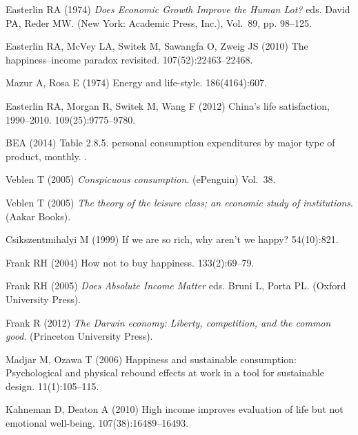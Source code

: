 \documentclass[10pt, letterpaper]{article}
\begin{document}
\begin{spacing}{1.4}
\begin{thebibliography}{10}
Easterlin RA (1974) {\em Does Economic Growth Improve the Human Lot?} eds.{}
  David PA, Reder MW.
\newblock (New York: Academic Press, Inc.), Vol.{}~89, pp. 98--125.

Easterlin RA, McVey LA, Switek M, Sawangfa O, Zweig JS (2010) The
  happiness--income paradox revisited.
  107(52):22463--22468.

Mazur A, Rosa E (1974) Energy and life-style.
 186(4164):607.

Easterlin RA, Morgan R, Switek M, Wang F (2012) China's life satisfaction,
  1990--2010.
  109(25):9775--9780.

BEA (2014) Table 2.8.5. personal consumption expenditures by major type of
  product, monthly.
.

Veblen T (2005) {\em Conspicuous consumption}.
\newblock (ePenguin) Vol.{}~38.

Veblen T (2005) {\em The theory of the leisure class; an economic study of
  institutions}.
\newblock (Aakar Books).

Csikszentmihalyi M (1999) If we are so rich, why aren't we happy?
 54(10):821.

Frank RH (2004) How not to buy happiness.
 133(2):69--79.

Frank RH (2005) {\em Does Absolute Income Matter} eds.{} Bruni L, Porta PL.
\newblock (Oxford University Press).

Frank R (2012) {\em The Darwin economy: Liberty, competition, and the common
  good}.
\newblock (Princeton University Press).

Madjar M, Ozawa T (2006) Happiness and sustainable consumption: Psychological
  and physical rebound effects at work in a tool for sustainable design.
  11(1):105--115.

Kahneman D, Deaton A (2010) High income improves evaluation of life but not
  emotional well-being.
  107(38):16489--16493.


\end{thebibliography}
\end{spacing}
\end{document}
